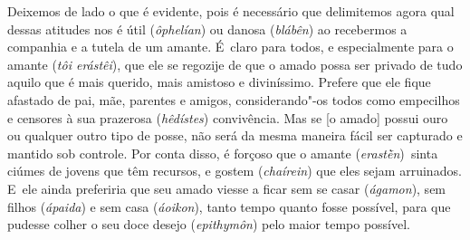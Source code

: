 Deixemos de lado o que é evidente, pois é necessário que delimitemos
agora \bekker{[239e]} qual dessas atitudes nos é útil (\emph{ôphelían}) ou
danosa (\emph{blábên}) ao recebermos a companhia e a tutela de um
amante. É~claro para todos, e especialmente para o amante (\emph{tôi
erástêi}), que ele se regozije de que o amado possa ser privado de tudo
aquilo que é mais querido, mais amistoso e diviníssimo. Prefere que ele
fique afastado de pai, mãe, parentes e amigos, \bekker{[240a]}
considerando"-os todos como empecilhos e censores à sua prazerosa
(\emph{hêdístes}) convivência. Mas se [o amado] possui ouro ou
qualquer outro tipo de posse, não será da mesma maneira fácil ser
capturado e mantido sob controle. Por conta disso, é forçoso que o
amante (\emph{erastḕn})\emph{~}sinta ciúmes de jovens que têm recursos,
e gostem (\emph{chaírein}) que eles sejam arruinados. E~ele ainda
preferiria que seu amado viesse a ficar sem se casar (\emph{ágamon}),
sem filhos (\emph{ápaida}) e sem casa (\emph{áoikon}), tanto tempo
quanto fosse possível, para que pudesse colher o seu doce desejo
(\emph{epithymôn}) pelo maior tempo possível.

